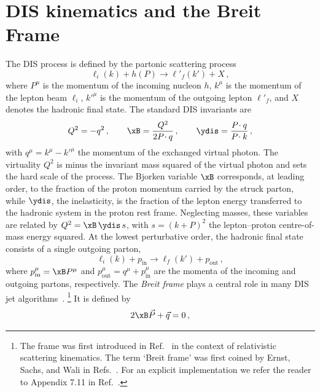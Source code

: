 \section{DIS kinematics and the Breit Frame}
\label{sec:Kinematics}

The DIS process is defined by the partonic scattering process
\begin{equation}
\label{eq:DIS-Process}
    \ell_i(k) + h(P) \rightarrow \ell'_f(k') + X\,,
\end{equation}
where $P^\mu$ is the momentum of the incoming nucleon $h$,
$k^\mu$ is the momentum of the lepton beam $\ell_i$,
$k'^\mu$ is the momentum of the outgoing lepton $\ell'_f$,
and $X$ denotes the hadronic final state. 
The standard DIS invariants are
\begin{equation}
\label{eq:DIS-invariants}
    Q^2 = -q^2\,, \qquad
    \xB = \frac{Q^2}{2 P\!\cdot q}\,, \qquad
    \ydis = \frac{P\!\cdot q}{P\!\cdot k}\,,
\end{equation}
with $q^\mu = k^\mu - k'^\mu$ the momentum of the exchanged virtual photon.
The virtuality $Q^2$ is minus the invariant mass squared of the virtual photon
and sets the hard scale of the process. The Bjorken
variable $\xB$ corresponds, at leading order, to the fraction of the
proton momentum carried by the struck parton, while $\ydis$, the
inelasticity, is the fraction of the lepton energy transferred to the
hadronic system in the proton rest frame. Neglecting masses, these
variables are related by $Q^2 = \xB\, \ydis\, s$, with $s = (k+P)^2$ the
lepton--proton centre-of-mass energy squared.
At the lowest perturbative order, the hadronic final state consists of a single outgoing parton,
\begin{equation}
\label{eq:DIS-LO}
    \ell_i(k) + p_{\mathrm{in}} \rightarrow \ell_f(k') + p_{\mathrm{out}}\,,
\end{equation}
where $p_{\mathrm{in}}^\mu = \xB P^\mu$ and $p_{\mathrm{out}}^\mu = q^\mu
+p_{\mathrm{in}}^\mu$ are the momenta of the incoming and outgoing
partons, respectively.  The \emph{Breit frame} plays a central role in many DIS jet
algorithms~\cite{Webber:1993bm}.%
\footnote{The frame was
	first introduced in Ref.~\cite{Breit:1929zz} in the context of
	relativistic scattering kinematics. The term `Breit frame' was
	first coined by Ernst, Sachs, and Wali in
	Refs.~\cite{Ernst:1960zza,Sachs:1962zzc}. For an explicit
	implementation we refer the reader to Appendix 7.11 in
	Ref.~\cite{Devenish:2004pb}.} 
%
It is defined by
\begin{equation}
  2\xB \vec{P} + \vec{q} = 0\,,
\end{equation}
